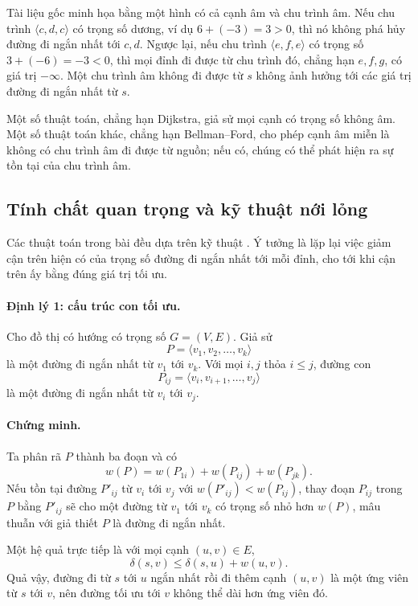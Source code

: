 \documentclass[11pt]{article}
\begin{document}
Tài liệu gốc minh họa bằng một hình có cả cạnh âm và chu trình âm. Nếu chu
trình \(\langle c,d,c\rangle\) có trọng số dương, ví dụ \(6+(-3)=3>0\), thì
nó không phá hủy đường đi ngắn nhất tới \(c,d\). Ngược lại, nếu chu trình
\(\langle e,f,e\rangle\) có trọng số \(3+(-6)=-3<0\), thì mọi đỉnh đi được từ
chu trình đó, chẳng hạn \(e,f,g\), có giá trị \(-\infty\). Một chu trình âm
không đi được từ \(s\) không ảnh hưởng tới các giá trị đường đi ngắn nhất từ
\(s\).

Một số thuật toán, chẳng hạn Dijkstra, giả sử mọi cạnh có trọng số không âm.
Một số thuật toán khác, chẳng hạn Bellman--Ford, cho phép cạnh âm miễn là
không có chu trình âm đi được từ nguồn; nếu có, chúng có thể phát hiện ra sự
tồn tại của chu trình âm.

\subsection{Tính chất quan trọng và kỹ thuật nới lỏng}

Các thuật toán trong bài đều dựa trên kỹ thuật . Ý tưởng là
lặp lại việc giảm cận trên hiện có của trọng số đường đi ngắn nhất tới mỗi
đỉnh, cho tới khi cận trên ấy bằng đúng giá trị tối ưu.

\paragraph{Định lý 1: cấu trúc con tối ưu.}
Cho đồ thị có hướng có trọng số \(G=(V,E)\). Giả sử
\[
  P=\langle v_1,v_2,\ldots,v_k\rangle
\]
là một đường đi ngắn nhất từ \(v_1\) tới \(v_k\). Với mọi \(i,j\) thỏa
\(i\le j\), đường con
\[
  P_{ij}=\langle v_i,v_{i+1},\ldots,v_j\rangle
\]
là một đường đi ngắn nhất từ \(v_i\) tới \(v_j\).

\paragraph{Chứng minh.}
Ta phân rã \(P\) thành ba đoạn và có
\[
  w(P)=w(P_{1i})+w(P_{ij})+w(P_{jk}).
\]
Nếu tồn tại đường \(P'_{ij}\) từ \(v_i\) tới \(v_j\) với
\(w(P'_{ij})<w(P_{ij})\), thay đoạn \(P_{ij}\) trong \(P\) bằng \(P'_{ij}\) sẽ
cho một đường từ \(v_1\) tới \(v_k\) có trọng số nhỏ hơn \(w(P)\), mâu thuẫn
với giả thiết \(P\) là đường đi ngắn nhất.

Một hệ quả trực tiếp là với mọi cạnh \((u,v)\in E\),
\[
  \delta(s,v)\le \delta(s,u)+w(u,v).
\]
Quả vậy, đường đi từ \(s\) tới \(u\) ngắn nhất rồi đi thêm cạnh \((u,v)\) là
một ứng viên từ \(s\) tới \(v\), nên đường tối ưu tới \(v\) không thể dài hơn
ứng viên đó.
\end{document}
